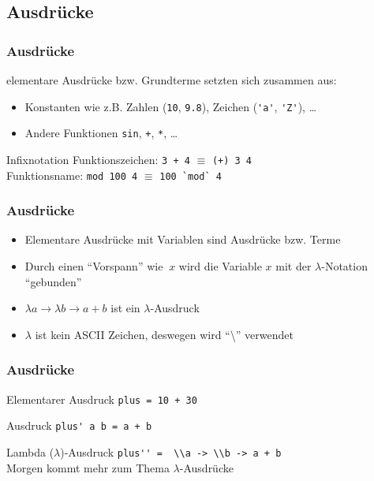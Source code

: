 \subsection{Ausdrücke}
\begin{frame}
\frametitle{Ausdrücke}
\begin{block}{\vspace*{-3ex}}
elementare Ausdrücke bzw. Grundterme setzten sich zusammen aus:
\begin{itemize}
  \item Konstanten wie z.B. Zahlen (\lstinline|10|, \lstinline|9.8|), Zeichen (\lstinline|'a'|, \lstinline|'Z'|), \ldots
  \item Andere Funktionen \lstinline|sin|, \lstinline|+|, \lstinline|*|, \ldots
\end{itemize}
\end{block}
\begin{alertblock}{Infixnotation}
Funktionszeichen: \lstinline|3 + 4| $\equiv$ \lstinline|(+) 3 4|\\
Funktionsname: \lstinline|mod 100 4| $\equiv$ \lstinline|100 `mod` 4|
\end{alertblock}
\end{frame}

\begin{frame}
\frametitle{Ausdrücke}
\begin{block}{\vspace*{-3ex}}
\begin{itemize}
  \item Elementare Ausdrücke mit Variablen sind Ausdrücke bzw. Terme
  \item Durch einen "`Vorspann"' wie $\ x$ wird die Variable $x$ mit der $\lambda$-Notation "`gebunden"'
  \item $\lambda a \to \lambda b \to a + b$ ist ein $\lambda$-Ausdruck
  \item $\lambda$ ist kein ASCII Zeichen, deswegen wird "`\textbackslash"' verwendet 
\end{itemize}
\end{block}
\end{frame}

\begin{frame}[fragile]
\frametitle{Ausdrücke} 
\begin{exampleblock}{Elementarer Ausdruck}
\lstinline|plus = 10 + 30|
\end{exampleblock}
\begin{exampleblock}{Ausdruck}
\lstinline|plus' a b = a + b|
\end{exampleblock}
\begin{exampleblock}{Lambda ($\lambda$)-Ausdruck}
\lstinline|plus'' =  \\a -> \\b -> a + b|\\
Morgen kommt mehr zum Thema $\lambda$-Ausdrücke
\end{exampleblock}
\end{frame}

